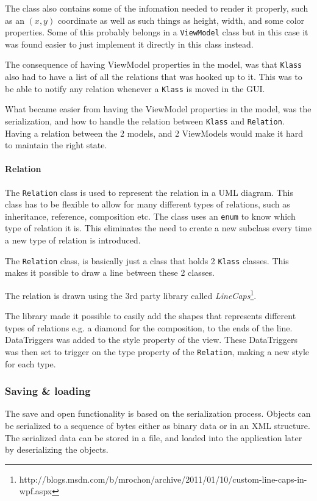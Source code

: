 The class also contains some of the infomation needed to render it properly, such as
an $(x, y)$ coordinate as well as such things as height, width, and some color
properties. Some of this probably belongs in a \texttt{ViewModel} class but in 
this case it was found easier to just implement it directly in this class instead.

The consequence of having ViewModel properties in the model, was that
\texttt{Klass} also had to have a list of all the relations that was hooked up
to it. This was to be able to notify any relation whenever a \texttt{Klass} is
moved in the GUI. 

What became easier from having the ViewModel properties in the model, was the
serialization, and how to handle the relation between \texttt{Klass} and
\texttt{Relation}. Having a relation between the 2 models, and 2 ViewModels
would make it hard to maintain the right state.

\paragraph{Relation}
The \texttt{Relation} class is used to represent the relation in a UML diagram.
This class has to be flexible to allow for many different types of relations,
such as inheritance, reference, composition etc. The class uses an \texttt{enum} to
know
which type of relation it is. This eliminates the need to create a new subclass
every time a new type of relation is introduced.

The \texttt{Relation} class, is basically just a class that holds 2
\texttt{Klass} classes. This makes it possible to draw a line between these 2
classes.

The relation is drawn using the 3rd party library called
\textit{LineCaps}\footnote{http://blogs.msdn.com/b/mrochon/archive/2011/01/10/custom-line-caps-in-wpf.aspx}.

The library made it possible to easily add the shapes that represents different
types of relations e.g. a diamond for the composition, to the ends of the line.
DataTriggers was added to the style property of the view. These DataTriggers was
then set to trigger on the type property of the \texttt{Relation}, making a new
style for each type.

\subsubsection{Saving \& loading}
The save and open functionality is based on the serialization process. Objects
can be serialized to a sequence of bytes either as binary data or in an XML
structure. The serialized data can be stored in a file, and loaded into the
application later by deserializing the objects.

